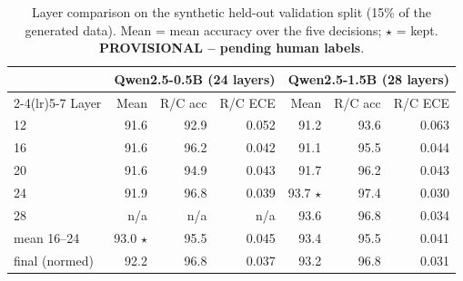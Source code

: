 \begin{table}[t]\centering\scriptsize
\caption{Layer comparison on the synthetic held-out validation split (15\% of the generated data). Mean = mean accuracy over the five decisions; $\star$ = kept. \textbf{PROVISIONAL -- pending human labels}.}
\label{tab:layers}\setlength{\tabcolsep}{3.5pt}
\begin{tabular}{lrrr rrr}\toprule
 & \multicolumn{3}{c}{Qwen2.5-0.5B (24 layers)} & \multicolumn{3}{c}{Qwen2.5-1.5B (28 layers)}\\
\cmidrule(lr){2-4}\cmidrule(lr){5-7}
Layer & Mean & R/C acc & R/C ECE & Mean & R/C acc & R/C ECE\\\midrule
12 & 91.6 & 92.9 & 0.052 & 91.2 & 93.6 & 0.063 \\
16 & 91.6 & 96.2 & 0.042 & 91.1 & 95.5 & 0.044 \\
20 & 91.6 & 94.9 & 0.043 & 91.7 & 96.2 & 0.043 \\
24 & 91.9 & 96.8 & 0.039 & 93.7 $\star$ & 97.4 & 0.030 \\
28 & n/a & n/a & n/a & 93.6 & 96.8 & 0.034 \\
mean 16--24 & 93.0 $\star$ & 95.5 & 0.045 & 93.4 & 95.5 & 0.041 \\
final (normed) & 92.2 & 96.8 & 0.037 & 93.2 & 96.8 & 0.031 \\
\bottomrule\end{tabular}\end{table}
